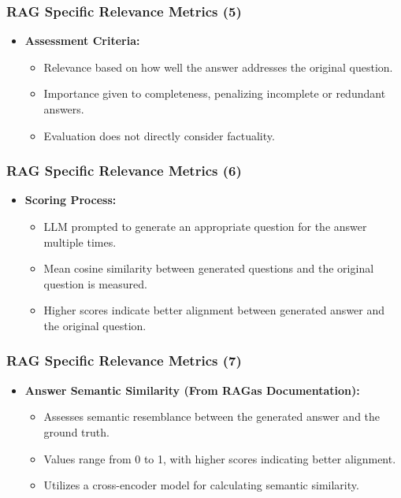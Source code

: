 \begin{frame}[fragile]\frametitle{RAG Specific Relevance Metrics (5)}
  \begin{itemize}
    \item \textbf{Assessment Criteria:}
      \begin{itemize}
        \item Relevance based on how well the answer addresses the original question.
        \item Importance given to completeness, penalizing incomplete or redundant answers.
        \item Evaluation does not directly consider factuality.
      \end{itemize}
  \end{itemize}
\end{frame}

\begin{frame}[fragile]\frametitle{RAG Specific Relevance Metrics (6)}
  \begin{itemize}
    \item \textbf{Scoring Process:}
      \begin{itemize}
        \item LLM prompted to generate an appropriate question for the answer multiple times.
        \item Mean cosine similarity between generated questions and the original question is measured.
        \item Higher scores indicate better alignment between generated answer and the original question.
      \end{itemize}
  \end{itemize}
\end{frame}

\begin{frame}[fragile]\frametitle{RAG Specific Relevance Metrics (7)}
  \begin{itemize}
    \item \textbf{Answer Semantic Similarity (From RAGas Documentation):}
      \begin{itemize}
        \item Assesses semantic resemblance between the generated answer and the ground truth.
        \item Values range from 0 to 1, with higher scores indicating better alignment.
        \item Utilizes a cross-encoder model for calculating semantic similarity.
      \end{itemize}
  \end{itemize}
\end{frame}

